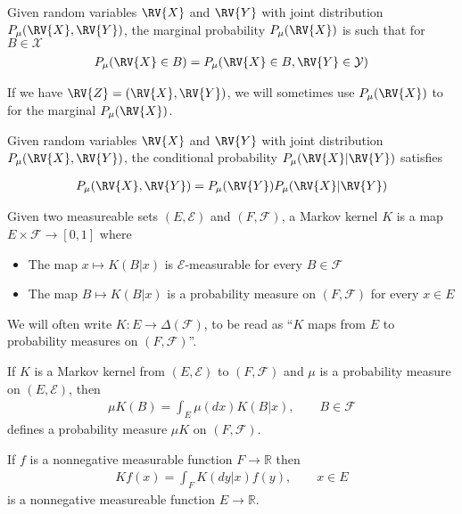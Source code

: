 \begin{definition}
Given random variables $\RV{X}$ and $\RV{Y}$ with joint distribution $P_\mu(\RV{X},\RV{Y})$, the marginal probability $P_\mu(\RV{X})$ is such that for $B\in\mathcal{X}$
\begin{align*}
    P_\mu(\RV{X}\in B) = P_\mu(\RV{X}\in B,\RV{Y}\in \mathcal{Y})
\end{align*}

If we have $\RV{Z}=(\RV{X},\RV{Y})$, we will sometimes use $P_\mu(\RV{X})$ to for the marginal $P_\mu(\RV{X})$.
\end{definition}

\begin{definition}
Given random variables $\RV{X}$ and $\RV{Y}$ with joint distribution $P_\mu(\RV{X},\RV{Y})$, the conditional probability $P_\mu(\RV{X}|\RV{Y})$ satisfies

\begin{align*}
    P_\mu(\RV{X},\RV{Y}) = P_\mu(\RV{Y})P_\mu(\RV{X}|\RV{Y})
\end{align*}

\begin{definition}
Given two measureable sets $(E,\mathcal{E})$ and $(F,\mathcal{F})$, a Markov kernel $K$ is a map $E\times \mathcal{F} \to [0,1]$ where
\begin{itemize}
    \item The map $x\mapsto K(B|x)$ is $\mathcal{E}$-measurable for every $B\in\mathcal{F}$
    \item The map $B\mapsto K(B|x)$ is a probability measure on $(F,\mathcal{F})$ for every $x\in E$ 
\end{itemize}

We will often write $K:E\to \Delta(\mathcal{F})$, to be read as ``$K$ maps from $E$ to probability measures on $(F,\mathcal{F})$''.

\end{definition}

\begin{definition}\label{def:kernel_products}
If $K$ is a Markov kernel from $(E,\mathcal{E})$ to $(F,\mathcal{F})$ and $\mu$ is a probability measure on $(E,\mathcal{E})$, then
\begin{align}
    \mu K(B)=\int_E \mu(dx) K(B|x),\qquad B\in\mathcal{F}
\end{align}
defines a probability measure $\mu K$ on $(F,\mathcal{F})$.

If $f$ is a nonnegative measurable function $F\to \mathbb{R}$ then
\begin{align}
    Kf(x) = \int_F K(dy|x)f(y), \qquad x\in E
\end{align}
is a nonnegative measureable function $E\to \mathbb{R}$.


\end{definition}
\end{definition}
